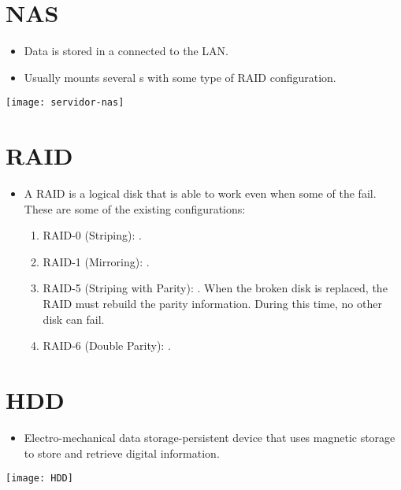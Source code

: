 \section{\gls{NAS}}
\begin{itemize}
\item Data is stored in a 
  connected to the \gls{LAN}.
\item Usually mounts several s with some type of
  \gls{RAID} configuration.
\end{itemize}
\vspace{-4ex}
\begin{center}
  \texttt{[image: servidor-nas]}
\end{center}

\section{\gls{RAID}}
\begin{itemize}
\item A \gls{RAID} is a logical disk that is able to work even when
  some of the 
  fail. These are some of the existing configurations:
  \begin{enumerate}
  \item RAID-0 (Striping): .
  \item RAID-1 (Mirroring): .
  \item RAID-5 (Striping with Parity): . When the broken disk is replaced, the RAID must
    rebuild the parity information. During this time, no other disk
    can fail.
  \item RAID-6 (Double Parity): .
  \end{enumerate}
\end{itemize}

\section{\gls{HDD}}
\begin{itemize}
\item Electro-mechanical data storage-persistent device that uses
  magnetic storage to store and retrieve digital information.
\end{itemize}
\vspace{-4ex}
\begin{center}
  \texttt{[image: HDD]}
\end{center}

